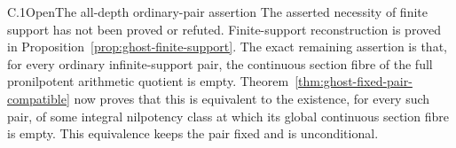\begin{result}{C.1}{Open}{The all-depth ordinary-pair assertion}
\label{task:ghost-c1}
The asserted necessity of finite support has not been proved or
refuted. Finite-support reconstruction is proved in
Proposition~\ref{prop:ghost-finite-support}. The exact remaining
assertion is that, for every ordinary infinite-support pair,
the continuous section fibre of the full pronilpotent arithmetic
quotient is empty. Theorem~\ref{thm:ghost-fixed-pair-compatible}
now proves that this is equivalent to the existence, for every
such pair, of some integral nilpotency class at which its
global continuous section fibre is empty. This equivalence
keeps the pair fixed and is unconditional.


\end{result}
